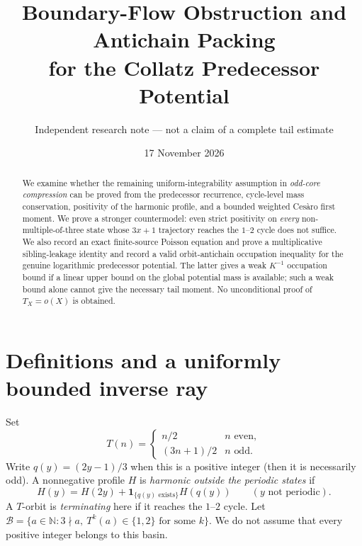 \documentclass[11pt,a4paper]{article}
\title{Boundary-Flow Obstruction and Antichain Packing\\for the Collatz Predecessor Potential}
\author{Independent research note --- not a claim of a complete tail estimate}
\date{17 November 2026}
\newcommand{\N}{\mathbb N}
\newcommand{\ind}{\mathbf 1}
\begin{document}
\maketitle
\begin{abstract}
We examine whether the remaining uniform-integrability assumption in
\emph{odd-core compression} can be proved from the predecessor recurrence,
cycle-level mass conservation, positivity of the harmonic profile, and a
bounded weighted Ces\`aro first moment. We prove a stronger countermodel:
even strict positivity on \emph{every} non-multiple-of-three state whose
$3x+1$ trajectory reaches the $1$--$2$ cycle does not suffice. We also
record an exact finite-source Poisson equation and prove a
multiplicative sibling-leakage identity and record a valid
orbit-antichain occupation inequality for the genuine
logarithmic predecessor potential. The latter gives a weak $K^{-1}$
occupation bound if a linear upper bound on the global potential mass is
available; such a weak bound alone cannot give the necessary tail moment.
No unconditional proof of $T_X=o(X)$ is obtained.
\end{abstract}

\section{Definitions and a uniformly bounded inverse ray}
Set
\[
T(n)=\begin{cases}n/2&n\text{ even},\\(3n+1)/2&n\text{ odd}.
\end{cases}
\]
Write $q(y)=(2y-1)/3$ when this is a positive integer (then it is
necessarily odd). A nonnegative profile $H$ is \emph{harmonic outside the
periodic states} if
\begin{equation}\label{eq:harmonic}
 H(y)=H(2y)+\ind_{\{q(y)\text{ exists}\}}H(q(y))
 \qquad (y\text{ not periodic}).
\end{equation}
A $T$-orbit is \emph{terminating} here if it reaches the $1$--$2$ cycle.
Let $\mathcal B=\{a\in\N:3\nmid a,\ T^k(a)\in\{1,2\}\text{ for some }k\}$.
We do not assume that every positive integer belongs to this basin.
\end{document}
